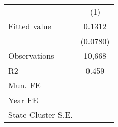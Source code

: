 {
\def\sym#1{\ifmmode^{#1}\else\(^{#1}\)\fi}
\begin{tabular}{l*{1}{c}}
            &\multicolumn{1}{c}{(1)}         \\
\addlinespace
Fitted value&      0.1312         \\
            &    (0.0780)         \\
\addlinespace
Observations&      10,668         \\
R2          &       0.459         \\
Mun. FE     &                     \\
Year FE     &                     \\
State Cluster S.E.&                     \\
\end{tabular}
}
